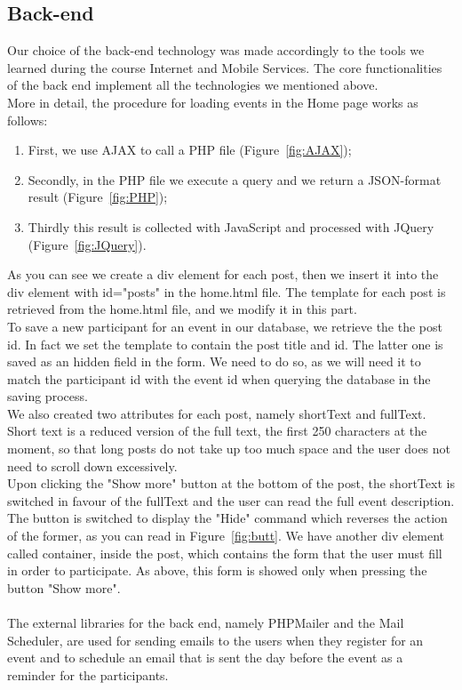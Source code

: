 \documentclass[a4paper]{article}
\begin{document}
	\subsection{Back-end}
	Our choice of the back-end technology was made accordingly to the tools we learned during the course Internet and Mobile Services. The core functionalities of the back end implement all the technologies we mentioned above.\\
	More in detail, the procedure for loading events in the Home page works as follows:
	\begin{enumerate}
		\item First, we use AJAX to call a PHP file (Figure~\ref{fig:AJAX});
		\item Secondly, in the PHP file we execute a query and we return a JSON-format result (Figure~\ref{fig:PHP});
		\item Thirdly this result is collected with JavaScript and processed with JQuery (Figure~\ref{fig:JQuery}).
	\end{enumerate} 
	As you can see we create a div element for each post, then we insert it into the div element with id="posts" in the home.html file. The template for each post is retrieved from the home.html file, and we modify it in this part.\\
	To save a new participant for an event in our database, we retrieve the the post id. In fact we set the template to contain the post title and id. The latter one is saved as an hidden field in the form. We need to do so, as we will need it to match the participant id with the event id when querying the database in the saving process.\\
	We also created two attributes for each post, namely shortText and fullText. Short text is a reduced version of the full text, the first 250 characters at the moment, so that long posts do not take up too much space and the user does not need to scroll down excessively.\\
	Upon clicking the "Show more" button at the bottom of the post, the shortText is switched in favour of the fullText and the user can read the full event description. The button is switched to display the "Hide" command which reverses the action of the former, as you can read in Figure~\ref{fig:butt}. We have another div element called container, inside the post, which contains the form that the user must fill in order to participate. As above, this form is showed only when pressing the button "Show more".\\\\
	The external libraries for the back end, namely PHPMailer and the Mail Scheduler, are used for sending emails to the users when they register for an event and to schedule an email that is sent the day before the event as a reminder for the participants.
	
\end{document}
